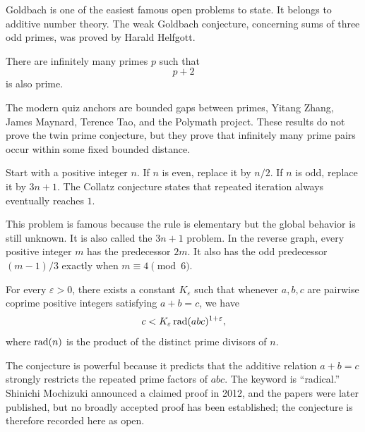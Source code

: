     \begin{remark}
        Goldbach is one of the easiest famous open problems to state. It belongs
        to additive number theory. The weak Goldbach conjecture, concerning sums
        of three odd primes, was proved by Harald Helfgott.
    \end{remark}

    \begin{openproblem}
        There are infinitely many primes $p$ such that
        \[
            p+2
        \]
        is also prime.
    \end{openproblem}

    \begin{remark}
        The modern quiz anchors are bounded gaps between primes, Yitang Zhang,
        James Maynard, Terence Tao, and the Polymath project. These results do
        not prove the twin prime conjecture, but they prove that infinitely many
        prime pairs occur within some fixed bounded distance.
    \end{remark}

    \begin{openproblem}
        Start with a positive integer $n$. If $n$ is even, replace it by $n/2$.
        If $n$ is odd, replace it by $3n+1$. The Collatz conjecture states that
        repeated iteration always eventually reaches $1$.
    \end{openproblem}

    \begin{remark}
        This problem is famous because the rule is elementary but the global
        behavior is still unknown. It is also called the $3n+1$ problem. In the
        reverse graph, every positive integer $m$ has the predecessor $2m$.
        It also has the odd predecessor $(m-1)/3$ exactly when
        $m\equiv4\pmod6$.
    \end{remark}

    \begin{conjecture}
        For every $\varepsilon>0$, there exists a constant $K_{\varepsilon}$ such that whenever $a,b,c$ are pairwise coprime positive integers satisfying
        $a+b=c$, we have
        \[
            c<K_{\varepsilon} \operatorname{rad}(abc)^{1+\varepsilon},
        \]
        where $\operatorname{rad}(n)$ is the product of the distinct prime
        divisors of $n$.
    \end{conjecture}

    \begin{remark}
        The conjecture is powerful because it predicts that the additive
        relation $a+b=c$ strongly restricts the repeated prime factors of
        $abc$. The keyword is ``radical.'' Shinichi Mochizuki announced a
        claimed proof in 2012, and the papers were later published, but no
        broadly accepted proof has been established; the conjecture is
        therefore recorded here as open.
    \end{remark}

